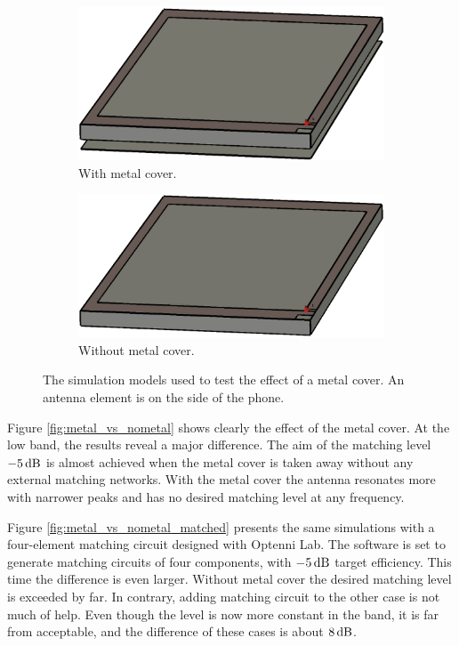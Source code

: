 \begin{figure}[H]
    \centering
    \begin{subfigure}[b]{0.49\textwidth}
    \includegraphics[width=\textwidth]{img/metal_cover.eps}
    \caption{With metal cover.}
    \label{fig:metal_cover}
    \end{subfigure}
    \begin{subfigure}[b]{0.49\textwidth}
    \includegraphics[width=\textwidth]{img/no_metal_cover.eps}
    \caption{Without metal cover.}
    \label{fig:nometal_cover}
    \end{subfigure}
    \caption{The simulation models used to test the effect of a metal cover. An antenna element is on the side of the phone.}
    \label{fig:metal_vs_nometal_model}
\end{figure}

Figure \ref{fig:metal_vs_nometal} shows clearly the effect of the metal cover. At the low band, the results reveal a major difference. The aim of the matching level $-5\,\mathrm{dB}$ is almost achieved when the metal cover is taken away without any external matching networks. With the metal cover the antenna resonates more with narrower peaks and has no desired matching level at any frequency. 

Figure \ref{fig:metal_vs_nometal_matched} presents the same simulations with a four-element matching circuit designed with Optenni Lab. The software is set to generate matching circuits of four components, with $-5\,\mathrm{dB}$ target efficiency. This time the difference is even larger. Without metal cover the desired matching level is exceeded by far. In contrary, adding matching circuit to the other case is not much of help. Even though the level is now more constant in the band, it is far from acceptable, and the difference of these cases is about $8\,\mathrm{dB}$.

